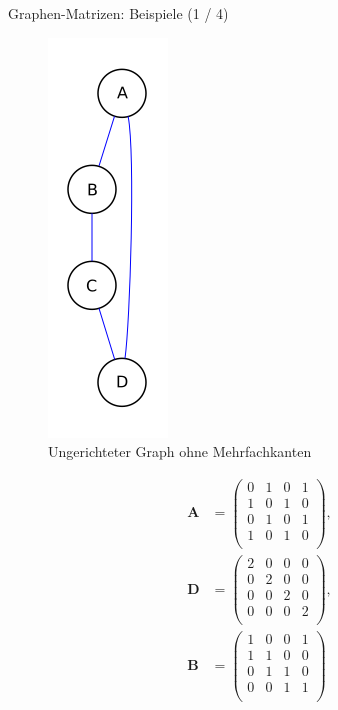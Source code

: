 \documentclass[aspectratio=169]{beamer}
\begin{document}
\begin{frame}{Graphen-Matrizen: Beispiele (1 / 4)}

  \begin{multicols*}{2}
    
    \begin{figure}[H]
      \centering
      \includegraphics[height = 0.6 \textheight]{120px-Graph_ungerichtet.svg.png}
      \caption{Ungerichteter Graph ohne Mehrfachkanten}
    \end{figure}

    \begin{align*}
      \mathbf A
      & =
      \begin{pmatrix}
        0 & 1 & 0 & 1 \\
        1 & 0 & 1 & 0 \\
        0 & 1 & 0 & 1 \\
        1 & 0 & 1 & 0 \\
      \end{pmatrix}, \\
      \mathbf D
      & =
      \begin{pmatrix}
        2 & 0 & 0 & 0 \\
        0 & 2 & 0 & 0 \\
        0 & 0 & 2 & 0 \\
        0 & 0 & 0 & 2 \\
      \end{pmatrix}, \\
      \mathbf B
      & =
      \begin{pmatrix}
        1 & 0 & 0 & 1 \\
        1 & 1 & 0 & 0 \\
        0 & 1 & 1 & 0 \\
        0 & 0 & 1 & 1 \\
      \end{pmatrix}
    \end{align*}

  \end{multicols*}

\end{frame}
\end{document}
